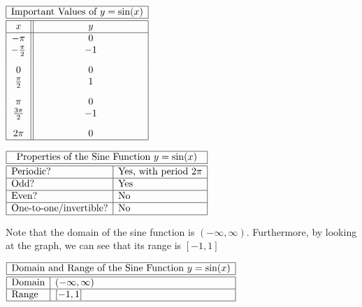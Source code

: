 \documentclass[nooutcomes]{ximera}
\begin{document}
\begin{center}
\(
\begin{array}{ |c || c|  }
 \hline
 \multicolumn{2}{|c|}{\text{\normalfont Important Values of } y=\sin(x)} \\
\hline
 \hline
 x & y\\
 \hline

 -\pi&0\\

 -\frac{\pi}{2}&-1\\[2ex]

 0&0\\

 \frac{\pi}{2}&1\\[2ex]

 \pi&0\\

\frac{3\pi}{2}&-1\\[2ex]

 2 \pi&0\\
\hline
\end{array}
\)
\end{center}

\begin{center}
$
\begin{array}{|l|l|}
 \hline
 \multicolumn{2}{|c|}{\text{\normalfont Properties of the Sine Function } y=\sin(x)} \\
\hline
 \hline
\text{Periodic?} & \text{Yes, with period }2\pi \\ \hline
\text{Odd?} & \text{Yes} \\ \hline
\text{Even?} & \text{No} \\ \hline
\text{One-to-one/invertible?} & \text{No} \\ \hline
\end{array}
$
\end{center}


Note that the domain of the sine function is $(-\infty, \infty)$. Furthermore, by looking at the graph, we can see that its range is $[-1, 1]$

\begin{center}
$
\begin{array}{|l|l|}
 \hline
 \multicolumn{2}{|c|}{\text{\normalfont Domain and Range of the Sine Function } y= \sin(x)} \\
\hline
 \hline
\text{Domain} & (-\infty, \infty) \\ \hline
\text{Range} & [-1, 1] \\ \hline
\end{array}
$
\end{center}
\end{document}
